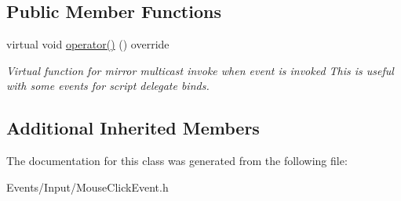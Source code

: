 \subsection*{Public Member Functions}
\begin{DoxyCompactItemize}
\item 
\mbox{\label{classToggleMouseWarpEvent_a83a819ff1a63bc19c84d2567035461f6}} 
virtual void \hyperlink{classToggleMouseWarpEvent_a83a819ff1a63bc19c84d2567035461f6}{operator()} () override
\begin{DoxyCompactList}\small\item\em Virtual function for mirror multicast invoke when event is invoked This is useful with some events for script delegate binds. \end{DoxyCompactList}\end{DoxyCompactItemize}
\subsection*{Additional Inherited Members}


The documentation for this class was generated from the following file\+:\begin{DoxyCompactItemize}
\item 
Events/\+Input/Mouse\+Click\+Event.\+h\end{DoxyCompactItemize}

